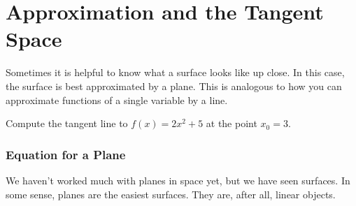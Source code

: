                  \section{Approximation and the Tangent Space}
                                        Sometimes it is helpful to know what a surface looks like up close.  In this case, the surface is best approximated by a plane.  This is analogous to how you can approximate functions of a single variable by a line.
                                        
                                        \begin{exercise}
                                        Compute the tangent line to $f(x)=2x^2+5$ at the point $x_0=3$.
                                        \end{exercise}
                                        
                                        \subsubsection{Equation for a Plane}
                                        
                                        We haven't worked much with planes in space yet, but we have seen surfaces.  In some sense, planes are the easiest surfaces.  They are, after all, linear objects.
                                        
